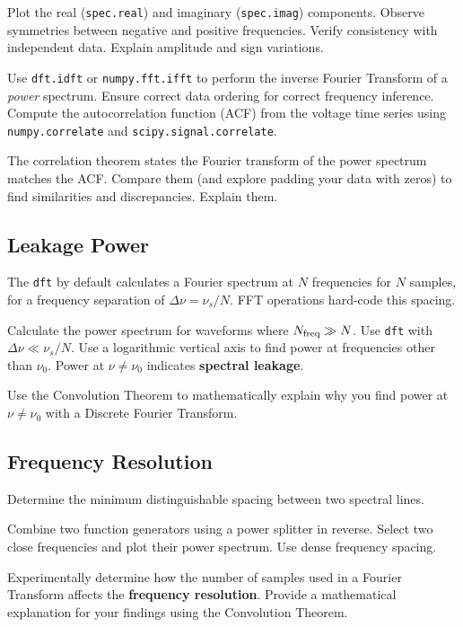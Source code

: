 \documentclass[11pt,preprint]{aastex}
\begin{document}
Plot the real ({\tt spec.real}) and imaginary ({\tt spec.imag}) components.
Observe symmetries between negative and positive frequencies.
Verify consistency with independent data.
Explain amplitude and sign variations.

Use {\tt dft.idft} or {\tt numpy.fft.ifft} to 
perform the inverse Fourier Transform of a {\it power} spectrum.
Ensure correct data ordering for correct frequency inference.
Compute the autocorrelation function (ACF) from the voltage time series using
{\tt numpy.correlate} and {\tt scipy.signal.correlate}.

The correlation theorem states the Fourier transform of the power spectrum
matches the ACF.
Compare them (and explore padding your data with zeros) to find similarities
and discrepancies.
Explain them.


\subsection{Leakage Power}
\label{subleakage}

\noindent
The {\tt dft} by default calculates a Fourier spectrum at $N$ frequencies for $N$ samples,
for a frequency separation of $\Delta\nu = \nu_s/N$.
FFT operations hard-code this spacing.

Calculate the power spectrum for waveforms where $N_{\rm freq}\gg N$.
Use {\tt dft} with $\Delta \nu \ll \nu_s/N$.
Use a logarithmic vertical axis to find power at frequencies other than $\nu_0$.
Power at $\nu\ne\nu_0$ indicates \textbf{spectral leakage}.

Use the Convolution Theorem to mathematically explain why you find power
at $\nu\ne\nu_0$ with a Discrete Fourier Transform.


\subsection{Frequency Resolution}
\label{freqres}

\noindent
Determine the minimum distinguishable spacing between two spectral lines.

Combine two function generators using a power splitter in reverse.
Select two close frequencies and plot their power spectrum.
Use dense frequency spacing.

Experimentally determine how the number of samples used in a 
Fourier Transform affects the \textbf{frequency resolution}.
Provide a mathematical explanation for your findings using the Convolution Theorem.
\end{document}
